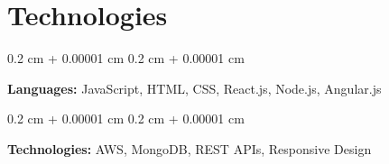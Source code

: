 \documentclass[10pt, letterpaper]{article}
\newenvironment{onecolentry}{
    \begin{adjustwidth}{
        0.2 cm + 0.00001 cm
    }{
        0.2 cm + 0.00001 cm
    }
}{
    \end{adjustwidth}
} %
\begin{document}
    
    \section{Technologies}

        \begin{onecolentry}
            \textbf{Languages:} JavaScript, HTML, CSS, React.js, Node.js, Angular.js
        \end{onecolentry}

        \vspace{0.2 cm}

        \begin{onecolentry}
            \textbf{Technologies:} AWS, MongoDB, REST APIs, Responsive Design
        \end{onecolentry}
\end{document}
